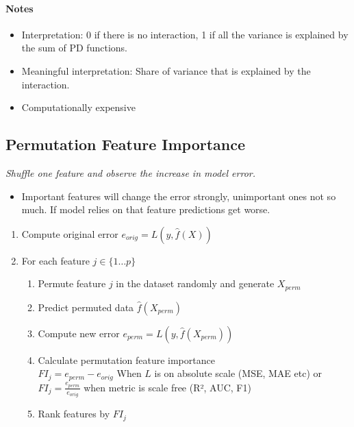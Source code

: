 \paragraph{Notes}
\begin{itemize}
	\item Interpretation: 0 if there is no interaction, 1 if all the variance is explained by the sum of PD functions.
	\item Meaningful interpretation: Share of variance that is explained by the interaction.
	\item Computationally expensive
\end{itemize}


\subsection{Permutation Feature Importance}
\textit{Shuffle one feature and observe the increase in model error.}

\begin{itemize}
	\item Important features will change the error strongly, unimportant ones not so much.
	      If model relies on that feature predictions get worse.
\end{itemize}

\begin{enumerate}
	\item Compute original error $e_{orig} = L(y, \hat f(X))$
	\item For each feature $j \in \{1 \dots p\}$
	      \begin{enumerate}
		      \item Permute feature $j$ in the dataset randomly and generate $X_{perm}$
		      \item Predict permuted data $\hat f(X_{perm})$
		      \item Compute new error $e_{perm} = L(y, \hat f(X_{perm}))$
		      \item Calculate permutation feature importance \\
		            $FI_j = e_{perm} - e_{orig} $ When $L$ is on absolute scale (MSE, MAE etc) or $FI_j = \frac{e_{perm}}{e_{orig}}$ when metric is scale free (R², AUC, F1)
		      \item Rank features by $FI_j$
	      \end{enumerate}
\end{enumerate}

